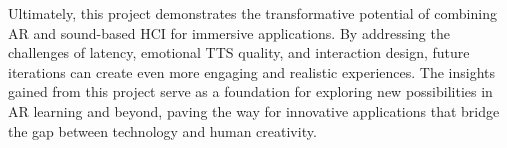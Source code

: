 Ultimately, this project demonstrates the transformative potential of combining AR and sound-based HCI for immersive applications. By addressing the challenges of latency, emotional TTS quality, and interaction design, future iterations can create even more engaging and realistic experiences. The insights gained from this project serve as a foundation for exploring new possibilities in AR learning and beyond, paving the way for innovative applications that bridge the gap between technology and human creativity.






